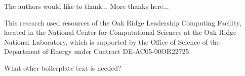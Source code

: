 The authors would like to thank... More thanks here...

This research used resources of the Oak Ridge Leadership Computing Facility,
located in the National Center for Computational Sciences at the Oak Ridge
National Laboratory, which is supported by the Office of Science of the
Department of Energy under Contract DE-AC05-00OR22725.

What other boilerplate text is needed?
